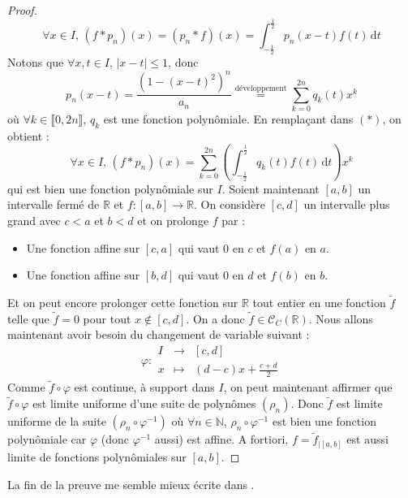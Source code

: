 \begin{proof}
    \[ \forall x \in I, \, (f*p_n)(x) = (p_n*f)(x) = \int_{-\frac{1}{2}}^{\frac{1}{2}} p_n(x-t) f(t) \, \mathrm{d}t \tag{$*$} \]
    Notons que $\forall x, t \in I$, $|x-t| \leq 1$, donc
    \[ p_n(x-t) = \frac{(1 - (x-t)^2)^n}{a_n} \overset{\text{développement}}{=} \sum_{k=0}^{2n} q_k(t) x^k \]
    où $\forall k \in \llbracket 0, 2n \rrbracket$, $q_k$ est une fonction polynômiale. En remplaçant dans $(*)$, on obtient :
    \[ \forall x \in I, \, (f*p_n)(x) = \sum_{k=0}^{2n} \left( \int_{-\frac{1}{2}}^{\frac{1}{2}} q_k(t) f(t) \, \mathrm{d}t \right) x^k \]
    qui est bien une fonction polynômiale sur $I$.
    \newpar
    Soient maintenant $[a,b]$ un intervalle fermé de $\mathbb{R}$ et $f : [a, b] \rightarrow \mathbb{R}$. On considère $[c, d]$ un intervalle plus grand avec $c < a$ et $b < d$ et on prolonge $f$ par :
    \begin{itemize}
      \item Une fonction affine sur $[c, a]$ qui vaut $0$ en $c$ et $f(a)$ en $a$.
      \item Une fonction affine sur $[b, d]$ qui vaut $0$ en $d$ et $f(b)$ en $b$.
    \end{itemize}
    Et on peut encore prolonger cette fonction sur $\mathbb{R}$ tout entier en une fonction $\widetilde{f}$ telle que $\widetilde{f} = 0$ pour tout $x \notin [c, d]$. On a donc $\widetilde{f} \in \mathcal{C}_C(\mathbb{R})$. Nous allons maintenant avoir besoin du changement de variable suivant :
    \[ \varphi :
    \begin{array}{ccc}
      I &\rightarrow& [c, d] \\
      x &\mapsto& (d-c)x + \frac{c+d}{2}
    \end{array}
    \]
    Comme $\widetilde{f} \circ \varphi$ est continue, à support dans $I$, on peut maintenant affirmer que $\widetilde{f} \circ \varphi$ est limite uniforme d'une suite de polynômes $(\rho_n)$. Donc $\widetilde{f}$ est limite uniforme de la suite $(\rho_n \circ \varphi^{-1})$ où $\forall n \in \mathbb{N}$, $\rho_n \circ \varphi^{-1}$ est bien une fonction polynômiale car $\varphi$ (donc $\varphi^{-1}$ aussi) est affine. A fortiori, $f = \widetilde{f}_{|[a,b]}$ est aussi limite de fonctions polynômiales sur $[a,b]$.
  \end{proof}

  La fin de la preuve me semble mieux écrite dans \cite{[I-P]}.

